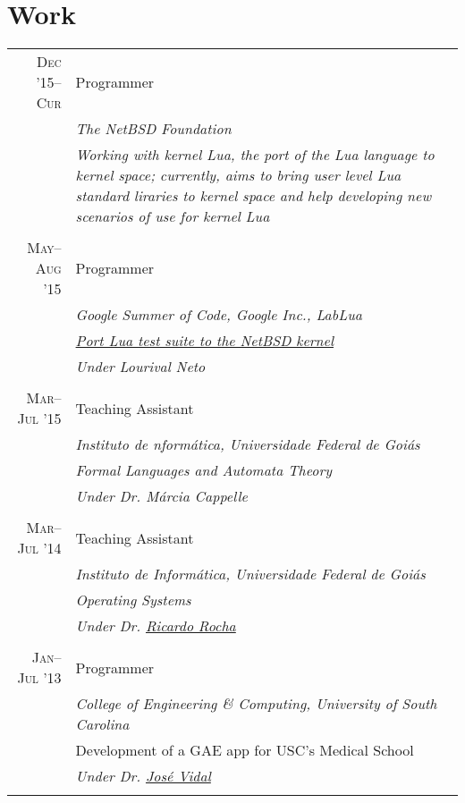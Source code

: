 \documentclass[a4paper,10pt]{article}
\begin{document}
\section{Work}
\begin{tabular}{r|p{11cm}}

  \textsc{Dec '15--Cur}
  & Programmer \\
  &\emph{The NetBSD Foundation}\\
  &\emph{\footnotesize{Working with kernel Lua, the port of the Lua language to
          kernel space; currently, aims to bring user level Lua standard liraries 
          to kernel space and help developing new scenarios of use for kernel 
          Lua}}
  \\\multicolumn{2}{c}{} \\
  
  \textsc{May--Aug '15}
  & Programmer \\
  &\emph{Google Summer of Code, Google Inc., LabLua}\\
  &\emph{\footnotesize{\href{https://www.google-melange.com/gsoc/project/details/google/gsoc2015/gmesalazar/5741031244955648}{Port Lua test suite to the NetBSD kernel}}}\\
  &\emph{Under Lourival Neto}
  \\\multicolumn{2}{c}{} \\

  \textsc{Mar--Jul '15}
  & Teaching Assistant\\
  &\emph{Instituto de nformática, Universidade Federal de Goiás}\\
  &\emph{\footnotesize{Formal Languages and Automata Theory}} \\
  &\emph{Under Dr. {Márcia Cappelle}} 
  \\\multicolumn{2}{c}{} \\

  \textsc{Mar--Jul '14}
  & Teaching Assistant \\
  &\emph{Instituto de Informática, Universidade Federal de Goiás}\\
  &\emph{\footnotesize{Operating Systems}} \\
  &\emph{Under Dr. \href{http://inf.ufg.br/~ricardo/}{Ricardo Rocha}}
  \\\multicolumn{2}{c}{} \\

  \textsc{Jan--Jul '13}
  & Programmer \\
  &\emph{College of Engineering \& Computing, University of South Carolina}\\
  &\footnotesize{Development of a GAE app for USC's Medical School}\\
  &\emph{Under Dr. \href{http://jmvidal.cse.sc.edu}{José Vidal}}
  \\\multicolumn{2}{c}{} \\


\end{tabular}
\end{document}
